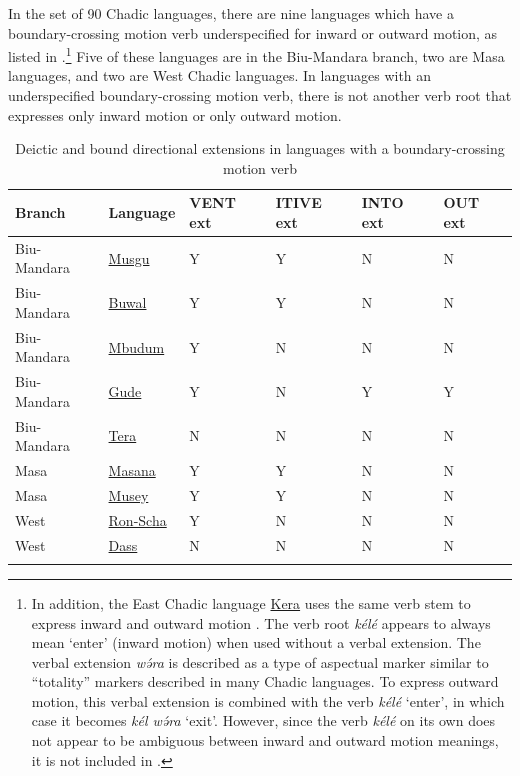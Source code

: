 In the set of 90 Chadic languages, there are nine languages which have a boundary-crossing motion verb underspecified for inward or outward motion, as listed in .\footnote{In addition, the East Chadic language \hyperref[kera]{Kera} uses the same verb stem to express inward and outward motion \citep{ebertSpracheUndTradition1976}. The verb root \textit{kélé} appears to always mean `enter' (inward motion) when used without a verbal extension. The verbal extension \textit{wə́ra} is described as a type of aspectual marker similar to ``totality'' markers described in many Chadic languages. To express outward motion, this verbal extension is combined with the verb \textit{kélé} `enter', in which case it becomes \textit{kél wə́ra} `exit'. However, since the verb \textit{kélé} on its own does not appear to be ambiguous between inward and outward motion meanings, it is not included in .} Five of these languages are in the Biu-Mandara branch, two are Masa languages, and two are West Chadic languages. In languages with an underspecified boundary-crossing motion verb, there is not another verb root that expresses only inward motion or only outward motion.

\begin{table}
	\caption{Deictic and bound directional extensions in languages with a boundary-crossing motion verb}
	\label{tab:inout}
	\begin{tabular}{llllll}
		\lsptoprule
		Branch & Language 				&  VENT ext &  ITIVE ext &  INTO ext &  OUT ext \\
		\midrule
		Biu-Mandara &   \hyperref[musg]{Musgu}  &   Y &    Y &   N &  N \\
		Biu-Mandara &    \hyperref[buwa]{Buwal} &   Y &    Y &   N &  N \\
		Biu-Mandara &   \hyperref[mbud]{Mbudum} &   Y &    N &   N &  N \\
		Biu-Mandara &     \hyperref[gude]{Gude} &   Y &    N &   Y &  Y \\
		Biu-Mandara &     \hyperref[tera]{Tera} &   N &    N &   N &  N \\
		Masa &   		\hyperref[masa]{Masana} &   Y &    Y &   N &  N \\
		Masa &    \hyperref[muse]{Musey} 		&   Y &    Y &   N &  N \\
		West &	 \hyperref[shaa]{Ron-Scha} 		&   Y &    N &   N &  N \\
		West &    \hyperref[dass]{Dass} 		&   N &    N &   N &  N \\
		\lspbottomrule
	\end{tabular}
\end{table}

